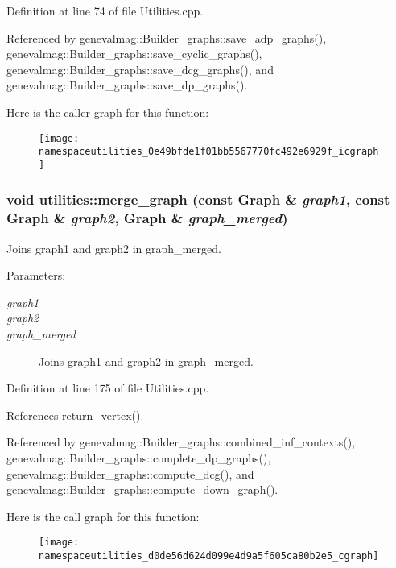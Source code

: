 Definition at line 74 of file Utilities.cpp.

Referenced by genevalmag::Builder\_\-graphs::save\_\-adp\_\-graphs(), genevalmag::Builder\_\-graphs::save\_\-cyclic\_\-graphs(), genevalmag::Builder\_\-graphs::save\_\-dcg\_\-graphs(), and genevalmag::Builder\_\-graphs::save\_\-dp\_\-graphs().

Here is the caller graph for this function:\nopagebreak
\begin{figure}[H]
\begin{center}
\leavevmode
\texttt{[image: namespaceutilities\_0e49bfde1f01bb5567770fc492e6929f\_icgraph]}
\end{center}
\end{figure}
\hypertarget{namespaceutilities_d0de56d624d099e4d9a5f605ca80b2e5}{
\subsubsection[{merge\_\-graph}]{\setlength{\rightskip}{0pt plus 5cm}void utilities::merge\_\-graph (const Graph \& {\em graph1}, \/  const Graph \& {\em graph2}, \/  Graph \& {\em graph\_\-merged})}}
\label{namespaceutilities_d0de56d624d099e4d9a5f605ca80b2e5}


Joins graph1 and graph2 in graph\_\-merged. \begin{Desc}
\item[Parameters:]
\begin{description}
\item[{\em graph1}]\item[{\em graph2}]\item[{\em graph\_\-merged}]Joins graph1 and graph2 in graph\_\-merged. \end{description}
\end{Desc}


Definition at line 175 of file Utilities.cpp.

References return\_\-vertex().

Referenced by genevalmag::Builder\_\-graphs::combined\_\-inf\_\-contexts(), genevalmag::Builder\_\-graphs::complete\_\-dp\_\-graphs(), genevalmag::Builder\_\-graphs::compute\_\-dcg(), and genevalmag::Builder\_\-graphs::compute\_\-down\_\-graph().

Here is the call graph for this function:\nopagebreak
\begin{figure}[H]
\begin{center}
\leavevmode
\texttt{[image: namespaceutilities\_d0de56d624d099e4d9a5f605ca80b2e5\_cgraph]}
\end{center}
\end{figure}


